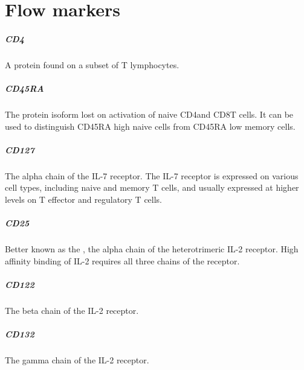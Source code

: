 \chapter{\label{appendix:flowsorting}{Flow markers}}

\paragraph{CD4}
A protein found on a subset of T lymphocytes.

\paragraph{CD45RA}
The protein isoform lost on activation of naive CD4\positive and CD8\positive T cells.
It can be used to distinguish CD45RA high naive cells from CD45RA low memory cells.

\paragraph{CD127}
The alpha chain of the IL-7 receptor.
The IL-7 receptor is expressed on various cell types, including naive and memory T cells,
and usually expressed at higher levels on T effector and regulatory T cells.


\paragraph{CD25}
Better known as the , the alpha chain of the heterotrimeric IL-2 receptor.
High affinity binding of IL-2 requires all three chains of the receptor.

\paragraph{CD122}
The beta chain of the IL-2 receptor.

\paragraph{CD132}
The gamma chain of the IL-2 receptor.

